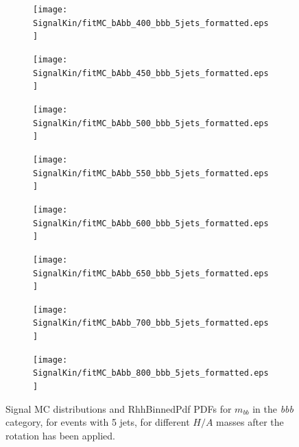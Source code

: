 \begin{figure}[phtb!]
  \begin{center}
  \begin{subfigure}[$m_{A}=400$ GeV]{0.4\textwidth}\texttt{[image: SignalKin/fitMC\_bAbb\_400\_bbb\_5jets\_formatted.eps]}\end{subfigure}
  \begin{subfigure}[$m_{A}=450$ GeV]{0.4\textwidth}\texttt{[image: SignalKin/fitMC\_bAbb\_450\_bbb\_5jets\_formatted.eps]}\end{subfigure}
  \begin{subfigure}[$m_{A}=500$ GeV]{0.4\textwidth}\texttt{[image: SignalKin/fitMC\_bAbb\_500\_bbb\_5jets\_formatted.eps]}\end{subfigure}
  \begin{subfigure}[$m_{A}=550$ GeV]{0.4\textwidth}\texttt{[image: SignalKin/fitMC\_bAbb\_550\_bbb\_5jets\_formatted.eps]}\end{subfigure}
  \begin{subfigure}[$m_{A}=600$ GeV]{0.4\textwidth}\texttt{[image: SignalKin/fitMC\_bAbb\_600\_bbb\_5jets\_formatted.eps]}\end{subfigure}
  \begin{subfigure}[$m_{A}=650$ GeV]{0.4\textwidth}\texttt{[image: SignalKin/fitMC\_bAbb\_650\_bbb\_5jets\_formatted.eps]}\end{subfigure}
  \begin{subfigure}[$m_{A}=700$ GeV]{0.4\textwidth}\texttt{[image: SignalKin/fitMC\_bAbb\_700\_bbb\_5jets\_formatted.eps]}\end{subfigure}
  \begin{subfigure}[$m_{A}=800$ GeV]{0.4\textwidth}\texttt{[image: SignalKin/fitMC\_bAbb\_800\_bbb\_5jets\_formatted.eps]}\end{subfigure}
  \caption{Signal MC distributions and RhhBinnedPdf PDFs for $m_{bb}$ in the {\it bbb} category, for events with 5 jets, for different $H/A$ masses after the rotation has been applied.\label{fig:signalPDFs_4j_bbb}} 
    \end{center}
\end{figure}



